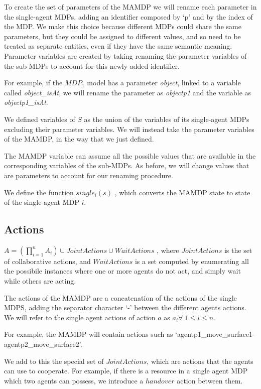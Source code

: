 To create the set of parameters of the MAMDP we will rename each parameter in the single-agent MDPs, adding an identifier composed by `p' and by the index of the MDP. We make this choice because different MDPs could share the same parameters, but they could be assigned to different values, and so need to be treated as separate entities, even if they have the same semantic meaning. Parameter variables are created by taking renaming the parameter variables of the sub-MDPs to account for this newly added identifier.

For example, if the $MDP_1$ model has a parameter \textit{object}, linked to a variable called \textit{object\_isAt}, we will rename the parameter as \textit{objectp1} and the variable as \textit{objectp1\_isAt}. 

We defined variables of $S$ as the union of the variables of its single-agent MDPs excluding their parameter variables. We will instead take the parameter variables of the MAMDP, in the way that we just defined.

The MAMDP variable can assume all the possible values that are available in the corresponding variables of the sub-MDPs. As before, we will change values that are parameters to account for our renaming procedure. 

We define the function $single_i(s)$ , which converts the MAMDP state to state of the single-agent MDP $i$.


\subsection{Actions}
$A=(\prod_{i=1}^{n} A_i) \cup JointActions \cup WaitActions$ , where $JointActions$ is the set of collaborative actions, and $WaitActions$ is a set computed by enumerating all the possibile instances where one or more agents do not act, and simply wait while others are acting.

The actions of the MAMDP are a concatenation of the actions of the single MDPS, adding the separator character `-' between the different agents actions. We will refer to the single agent actions of action $a$ as $a_i \forall \> 1\leq i \leq n$.

For example, the MAMDP will contain actions such as `agentp1\_move\_surface1-agentp2\_move\_surface2'.

We add to this the special set of $JointActions$, which are actions that the agents can use to cooperate. For example, if there is a resource in a single agent MDP which two agents can possess, we introduce a $handover$ action between them. 

